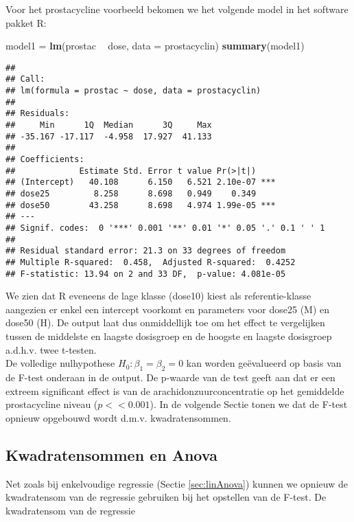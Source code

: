 \documentclass[12pt,dutch,coursenotes]{book}
\newenvironment{Shaded}{\begin{snugshade}}{\end{snugshade}}
\newcommand{\KeywordTok}[1]{\textcolor[rgb]{0.13,0.29,0.53}{\textbf{#1}}}
\newcommand{\DataTypeTok}[1]{\textcolor[rgb]{0.13,0.29,0.53}{#1}}
\newcommand{\StringTok}[1]{\textcolor[rgb]{0.31,0.60,0.02}{#1}}
\newcommand{\OperatorTok}[1]{\textcolor[rgb]{0.81,0.36,0.00}{\textbf{#1}}}
\newcommand{\NormalTok}[1]{#1}
\theoremstyle{definition}
\theoremstyle{definition}
\theoremstyle{definition}
\theoremstyle{remark}
\begin{document}
Voor het prostacycline voorbeeld bekomen we het volgende model in het
software pakket R:

\begin{Shaded}
\begin{Highlighting}[]
\NormalTok{model1 =}\StringTok{ }\KeywordTok{lm}\NormalTok{(prostac }\OperatorTok{~}\StringTok{ }\NormalTok{dose, }\DataTypeTok{data =}\NormalTok{ prostacyclin)}
\KeywordTok{summary}\NormalTok{(model1)}
\end{Highlighting}
\end{Shaded}

\begin{verbatim}
## 
## Call:
## lm(formula = prostac ~ dose, data = prostacyclin)
## 
## Residuals:
##     Min      1Q  Median      3Q     Max 
## -35.167 -17.117  -4.958  17.927  41.133 
## 
## Coefficients:
##             Estimate Std. Error t value Pr(>|t|)    
## (Intercept)   40.108      6.150   6.521 2.10e-07 ***
## dose25         8.258      8.698   0.949    0.349    
## dose50        43.258      8.698   4.974 1.99e-05 ***
## ---
## Signif. codes:  0 '***' 0.001 '**' 0.01 '*' 0.05 '.' 0.1 ' ' 1
## 
## Residual standard error: 21.3 on 33 degrees of freedom
## Multiple R-squared:  0.458,  Adjusted R-squared:  0.4252 
## F-statistic: 13.94 on 2 and 33 DF,  p-value: 4.081e-05
\end{verbatim}

We zien dat R eveneens de lage klasse (dose10) kiest als
referentie-klasse aangezien er enkel een intercept voorkomt en
parameters voor dose25 (M) en dose50 (H). De output laat dus
onmiddellijk toe om het effect te vergelijken tussen de middelste en
laagste dosisgroep en de hoogste en laagste dosisgroep a.d.h.v. twee
t-testen.\\
De volledige nulhypothese \(H_0: \beta_1=\beta_2=0\) kan worden
geëvalueerd op basis van de F-test onderaan in de output. De p-waarde
van de test geeft aan dat er een extreem significant effect is van de
arachidonzuurconcentratie op het gemiddelde prostacycline niveau
(\(p<<0.001\)). In de volgende Sectie tonen we dat de F-test opnieuw
opgebouwd wordt d.m.v. kwadratensommen.

\subsection{Kwadratensommen en Anova}\label{kwadratensommen-en-anova}

Net zoals bij enkelvoudige regressie (Sectie \ref{sec:linAnova}) kunnen
we opnieuw de kwadratensom van de regressie gebruiken bij het opstellen
van de F-test. De kwadratensom van de regressie
\end{document}
